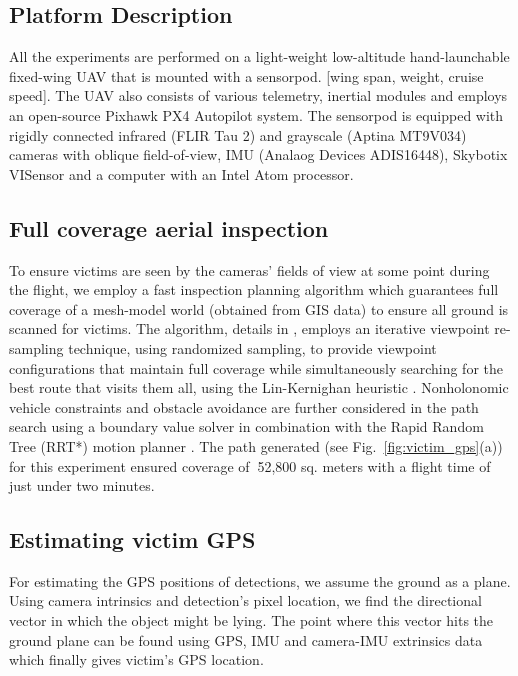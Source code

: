 \documentclass[runningheads]{llncs}
\begin{document}
\subsection{Platform Description}

All the experiments are performed on a light-weight low-altitude hand-launchable fixed-wing UAV that is mounted with a sensorpod. [wing span, weight, cruise speed]. The UAV also consists of various telemetry, inertial modules and employs an open-source Pixhawk PX4 Autopilot \cite{meier2015px4} system. The sensorpod is equipped with rigidly connected infrared (FLIR Tau 2) and grayscale (Aptina MT9V034) cameras with oblique field-of-view, IMU (Analaog Devices ADIS16448), Skybotix VISensor \cite{Skybotix} and a computer with an Intel Atom processor.

\subsection{Full coverage aerial inspection}

To ensure victims are seen by the cameras' fields of view at some point during the flight, we employ a fast inspection planning algorithm which guarantees full coverage of a mesh-model world (obtained from GIS data) to ensure all ground is scanned for victims. The algorithm, details in \cite{7140101}, employs an iterative viewpoint re-sampling technique, using randomized sampling, to provide viewpoint configurations that maintain full coverage while simultaneously searching for the best route that visits them all, using the Lin-Kernighan heuristic \cite{lin1973effective}. Nonholonomic vehicle constraints and obstacle avoidance are further considered in the path search using a boundary value solver in combination with the Rapid Random Tree (RRT*) motion planner \cite{RRTS1a}. The path generated (see Fig.~\ref{fig:victim_gps}(a)) for this experiment ensured coverage of $~$52,800 sq. meters with a flight time of just under two minutes.

\subsection{Estimating victim GPS}

For estimating the GPS positions of detections, we assume the ground as a plane. Using camera intrinsics and detection's pixel location, we find the directional vector in which the object might be lying. The point where this vector hits the ground plane can be found using GPS, IMU and camera-IMU extrinsics data which finally gives victim's GPS location.
\end{document}
